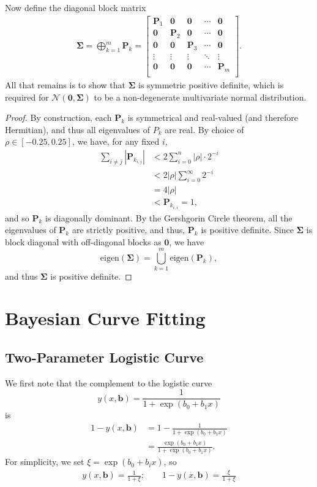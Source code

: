 \documentclass[11pt, letterpaper]{article}
\newcommand{\mc}[1]{\mathcal{#1}}
\begin{document}
Now define the diagonal block matrix
\begin{align*}
\bm \Sigma = \bigoplus^m_{k=1} \bm P_k = 
\begin{bmatrix}
\bm P_1 & \bm 0 & \bm 0 & \cdots & \bm 0 \\
\bm 0 & \bm P_2 & \bm 0 & \cdots & \bm 0 \\
\bm 0 & \bm 0 & \bm P_3 & \cdots & \bm 0 \\
\vdots & \vdots & \vdots &\ddots & \vdots\\
\bm 0 & \bm 0 & \bm 0 & \cdots & \bm P_m \\
\end{bmatrix}.
\end{align*}
All that remains is to show that $\bm \Sigma$ is symmetric positive definite, which is required for $\mc N(\bm 0, \bm \Sigma)$ to be a non-degenerate multivariate normal distribution. 
\begin{proof}
By construction, each $\bm P_k$ is symmetrical and real-valued (and therefore Hermitian), and thus all eigenvalues of \bm $P_k$ are real. By choice of $\rho \in [-0.25,0.25]$, we have, for any fixed $i$,
\begin{align*}
\sum_{i\neq j} | \bm P_{k_{i,j}}| &< 2 \sum_{i=0}^n |\rho| \cdot 2^{-i} \\
&< 2|\rho| \sum_{i=0}^\infty 2^{-i} \\
&= 4|\rho|\\
&< \bm P_{k_{i,i}} = 1,
\end{align*}
and so $\bm P_k$ is diagonally dominant. By the Gershgorin Circle theorem, all the eigenvalues of $\bm P_k$ are strictly positive, and thus, $\bm P_k$ is positive definite. Since $\bm \Sigma$ is block diagonal with off-diagonal blocks as $\bm 0$, we have 
$$ \text{eigen} \left(\bm \Sigma\right) = \bigcup_{k=1}^m \text{eigen}\left(\bm P_k\right),$$
and thus  $\bm \Sigma$ is positive definite.\qedhere
\end{proof}
\section{Bayesian Curve Fitting}
\subsection{Two-Parameter Logistic Curve}
We first note that the complement to the logistic curve $$y(x, \bm b) = \frac{1}{1+\exp(b_0+b_1x)} $$ is 
\begin{align*}
1 - y(x, \bm b) & = 1- \frac{1}{1+\exp(b_0+b_1x)} \\
& = \frac{\exp(b_0+b_1x)}{1+\exp(b_0+b_1x)}.
\end{align*}
For simplicity, we set $\xi = \exp(b_0 + b_i x)$, so 
\begin{align*}
y(x, \bm b) = \frac{1}{1+\xi}; \qquad 1 - y(x, \bm b) =  \frac{\xi}{1+\xi}
\end{align*}
\end{document}
